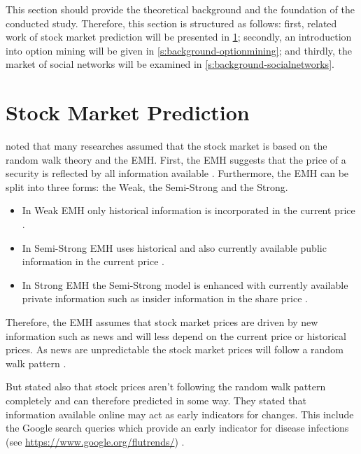 

This section should provide the theoretical background and the foundation of the conducted study.
Therefore, this section is structured as follows: 
first, related work of stock market prediction will be presented in \cref{s:background-stockmarketprediction};
secondly, an introduction into option mining will be given in \cref{s:background-optionmining};
and thirdly, the market of social networks will be examined in \cref{s:background-socialnetworks}.

\section{Stock Market Prediction} 
\label{s:background-stockmarketprediction}

\citet{Bollen2011a} noted that many researches assumed that the stock market is based on the random walk theory and the \ac{EMH}.
First, the \ac{EMH} suggests that the price of a security is reflected by all information available \citep{fama1965behavior, schumaker2009textual}.
Furthermore, the \ac{EMH} can be split into three forms: the Weak, the Semi-Strong and the Strong.

\begin{itemize}
    \item
        In Weak \ac{EMH} only historical information is incorporated in the current price \citep{schumaker2009textual}.

    \item
        In Semi-Strong \ac{EMH} uses historical and also currently available public information in the current price \citep{schumaker2009textual}.

    \item
        In Strong \ac{EMH} the Semi-Strong model is enhanced with currently available private information such as insider information in the share price \citep{schumaker2009textual}.
\end{itemize}

Therefore, the \ac{EMH} assumes that stock market prices are driven by new information such as news and will less depend on the current price or historical prices.
As news are unpredictable the stock market prices will follow a random walk pattern \citep{Bollen2011a}.

But \citeauthor{Bollen2011a} stated also that stock prices aren't following the random walk pattern completely and can therefore predicted in some way.
They stated that information available online may act as early indicators for changes.
This include the Google search queries which provide an early indicator for disease infections (see \url{https://www.google.org/flutrends/}) \citep{Bollen2011a}.

